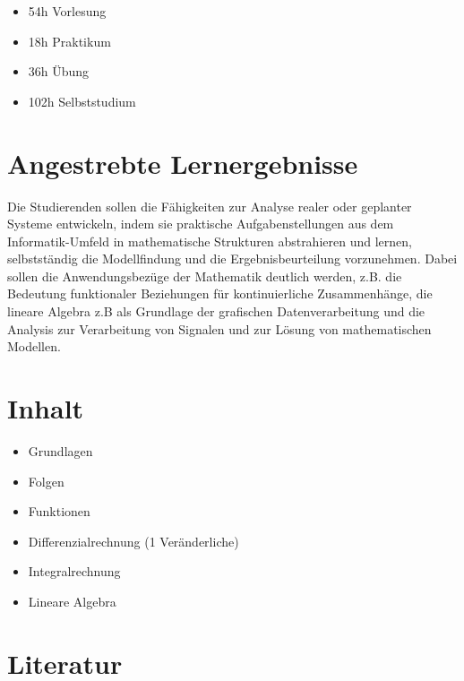 \begin{itemize}
\tightlist
\item
  54h Vorlesung
\item
  18h Praktikum
\item
  36h Übung
\item
  102h Selbststudium
\end{itemize}

\hypertarget{angestrebte-lernergebnissepathlabelmi-2017modulbeschreibungen-bachelorba_mathematik1}{%
\section*{Angestrebte
Lernergebnisse\label{/mi-2017/modulbeschreibungen-bachelor/BA_Mathematik1}}\label{angestrebte-lernergebnissepathlabelmi-2017modulbeschreibungen-bachelorba_mathematik1}}

Die Studierenden sollen die Fähigkeiten zur Analyse realer oder
geplanter Systeme entwickeln, indem sie praktische Aufgabenstellungen
aus dem Informatik-Umfeld in mathematische Strukturen abstrahieren und
lernen, selbstständig die Modellfindung und die Ergebnisbeurteilung
vorzunehmen. Dabei sollen die Anwendungsbezüge der Mathematik deutlich
werden, z.B. die Bedeutung funktionaler Beziehungen für kontinuierliche
Zusammenhänge, die lineare Algebra z.B als Grundlage der grafischen
Datenverarbeitung und die Analysis zur Verarbeitung von Signalen und zur
Lösung von mathematischen Modellen.

\hypertarget{inhaltpathlabelmi-2017modulbeschreibungen-bachelorba_mathematik1}{%
\section*{Inhalt\label{/mi-2017/modulbeschreibungen-bachelor/BA_Mathematik1}}\label{inhaltpathlabelmi-2017modulbeschreibungen-bachelorba_mathematik1}}

\begin{itemize}
\tightlist
\item
  Grundlagen
\item
  Folgen
\item
  Funktionen
\item
  Differenzialrechnung (1 Veränderliche)
\item
  Integralrechnung
\item
  Lineare Algebra
\end{itemize}

\hypertarget{literaturpathlabelmi-2017modulbeschreibungen-bachelorba_mathematik1}{%
\section*{Literatur\label{/mi-2017/modulbeschreibungen-bachelor/BA_Mathematik1}}\label{literaturpathlabelmi-2017modulbeschreibungen-bachelorba_mathematik1}}

